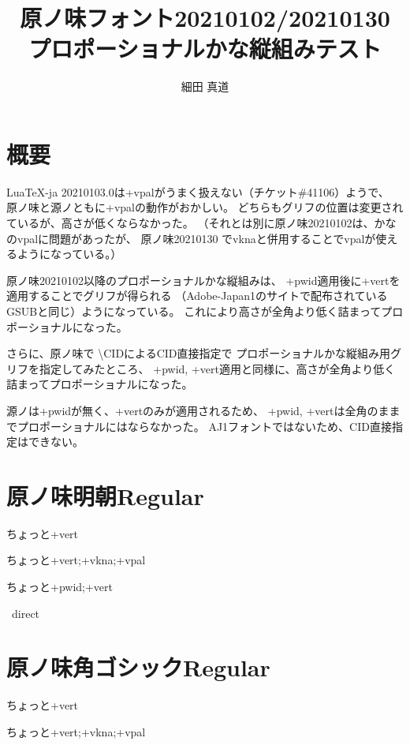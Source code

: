 \documentclass[tate,paper={297mm,210mm}]{jlreq}
\title{原ノ味フォント20210102/20210130 \\ プロポーショナルかな縦組みテスト}
\author{細田 真道}
\begin{document}
\maketitle

\section*{概要}

LuaTeX-ja 20210103.0は+vpalがうまく扱えない（チケット\#41106）ようで、
原ノ味と源ノともに+vpalの動作がおかしい。
どちらもグリフの位置は変更されているが、高さが低くならなかった。
（それとは別に原ノ味20210102は、かなのvpalに問題があったが、
  原ノ味20210130 でvknaと併用することでvpalが使えるようになっている。）

原ノ味20210102以降のプロポーショナルかな縦組みは、
+pwid適用後に+vertを適用することでグリフが得られる
（Adobe-Japan1のサイトで配布されているGSUBと同じ）ようになっている。
これにより高さが全角より低く詰まってプロポーショナルになった。

さらに、原ノ味で \textbackslash CIDによるCID直接指定で
プロポーショナルかな縦組み用グリフを指定してみたところ、
+pwid, +vert適用と同様に、高さが全角より低く詰まってプロポーショナルになった。

源ノは+pwidが無く、+vertのみが適用されるため、
+pwid, +vertは全角のままでプロポーショナルにはならなかった。
AJ1フォントではないため、CID直接指定はできない。

\clearpage

\section*{原ノ味明朝Regular}

\hmrnone\hbox{\tate\vrule ちょっと\vrule +vert}

\hmrvpal\hbox{\tate\vrule ちょっと\vrule +vert;+vkna;+vpal}

\hmrpwidvert\hbox{\tate\vrule ちょっと\vrule +pwid;+vert}

\hmrnone\hbox{\tate\vrule%
  \vrule direct}

\section*{原ノ味角ゴシックRegular}

\hgrnone\hbox{\tate\vrule ちょっと\vrule +vert}

\hgrvpal\hbox{\tate\vrule ちょっと\vrule +vert;+vkna;+vpal}
\end{document}
